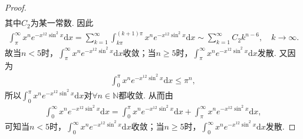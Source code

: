 \documentclass[../../main.tex]{subfiles}
\begin{document}
\begin{proof}
\begin{align*}
\end{align*}
其中$C_2$为某一常数. 因此
\begin{align*}
\int_{\pi}^{\infty}x^ne^{-x^{12}\sin^2x}\mathrm{d}x=\sum_{k=1}^{\infty}\int_{k\pi}^{(k+1)\pi}x^ne^{-x^{12}\sin^2x}\mathrm{d}x\sim \sum_{k=1}^{\infty}C_2k^{n-6},\quad k\rightarrow \infty.
\end{align*}
故当$n<5$时，$\int_{\pi}^{\infty}x^ne^{-x^{12}\sin^2x}\mathrm{d}x$收敛；当$n\geqslant 5$时，$\int_{\pi}^{\infty}x^ne^{-x^{12}\sin^2x}\mathrm{d}x$发散. 又因为
\begin{align*}
\int_0^{\pi}x^ne^{-x^{12}\sin^2x}\mathrm{d}x\leqslant \pi^n,
\end{align*}
所以$\int_0^{\pi}x^ne^{-x^{12}\sin^2x}\mathrm{d}x$对$\forall n\in \mathbb{N}$都收敛. 从而由
\begin{align*}
\int_0^{\infty}x^ne^{-x^{12}\sin^2x}\mathrm{d}x=\int_0^{\pi}x^ne^{-x^{12}\sin^2x}\mathrm{d}x+\int_{\pi}^{\infty}x^ne^{-x^{12}\sin^2x}\mathrm{d}x,
\end{align*}
可知当$n<5$时，$\int_0^{\infty}x^ne^{-x^{12}\sin^2x}\mathrm{d}x$收敛；当$n\geqslant 5$时，$\int_0^{\infty}x^ne^{-x^{12}\sin^2x}\mathrm{d}x$发散.
\end{proof}
\end{document}
